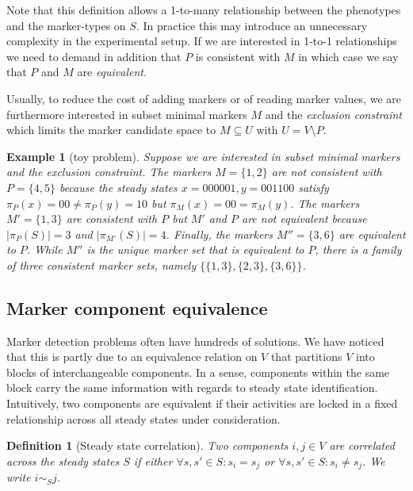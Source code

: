 \documentclass[11pt]{article}
\newtheorem{example}{Example}[section]
\newtheorem{definition}{Definition}[section]
\begin{document}
    Note that this definition allows a 1-to-many relationship between the phenotypes and the marker-types on $S$.
    In practice this may introduce an unnecessary complexity in the experimental setup.
    If we are interested in 1-to-1 relationships we need to demand in addition that $P$ is consistent with $M$ in which case we say that $P$ and $M$ are \emph{equivalent}.

    Usually, to reduce the cost of adding markers or of reading marker values, we are furthermore interested in subset minimal markers $M$ and the \emph{exclusion constraint} which limits the marker candidate space to $M \subseteq U$ with $U = V \setminus P$.

    \begin{example}[toy problem]
        Suppose we are interested in subset minimal markers and the exclusion constraint.
        The markers $M=\{1,2\}$ are not consistent with $P=\{4,5\}$ because the steady states $x=000001, y=001100$ satisfy $\pi_P(x) = 00 \neq \pi_P(y)= 10$ but $\pi_M(x)=00 = \pi_M(y)$.
        The markers $M'=\{1,3\}$ are consistent with $P$ but $M'$ and $P$ are not equivalent because $|\pi_P(S)|=3$ and $|\pi_{M'}(S)|=4$.
        Finally, the markers $M''=\{3,6\}$ are equivalent to $P$.
        While $M''$ is the unique marker set that is equivalent to $P$, there is a family of three consistent marker sets, namely $\{\{1,3\}, \{2,3\}, \{3,6\}\}$.
    \end{example}

    \subsection{Marker component equivalence}
    Marker detection problems often have hundreds of solutions.
    We have noticed that this is partly due to an equivalence relation on $V$ that partitions $V$ into blocks of interchangeable components.
    In a sense, components within the same block carry the same information with regards to steady state identification.
    Intuitively, two components are equivalent if their activities are locked in a fixed relationship across all steady states under consideration.

    \begin{definition}[Steady state correlation]
        Two components $i,j \in V$ are \emph{correlated} across the steady states $S$ if either $\forall s,s'\in S: s_i = s_j$ or $\forall s,s'\in S: s_i \neq s_j$.
        We write $i \sim_S j$.
    \end{definition}
\end{document}

